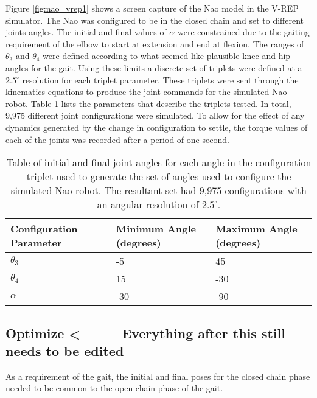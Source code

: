 Figure \ref{fig:nao_vrep1} shows a screen capture of the Nao model in the V-REP simulator. 
The Nao was configured to be in the closed chain and set to different joints angles. 
The initial and final values of $\alpha$ were constrained due to the gaiting requirement of the elbow to start at 
extension and end at flexion. The ranges of $\theta_3$ and $\theta_4$ were defined according to what seemed
like plausible knee and hip angles for the gait. Using these limits a discrete set of triplets were defined
at a $2.5^\circ$ resolution for each triplet parameter. These triplets were sent through the kinematics equations to produce the joint
commands for the simulated Nao robot. 
Table \ref{tab:angle_set_params1} lists the parameters that describe the triplets tested. In total, 9,975
different joint configurations were simulated.
To allow for the effect of
any dynamics generated by the change in configuration to settle, the torque values of each of the joints was recorded
after a period of one second.

\begin{table}
	\centering
	\begin{tabularx}{0.65\textwidth}{|X||X|X|}
		\hline
		\textbf{Configuration Parameter} 	&	\textbf{Minimum Angle (degrees)} 		&	\textbf{Maximum Angle (degrees)} 	\\	\hline\hline
		$\theta_3$ 							& 	-5										&	45	 								\\	\hline
		$\theta_4$							&	15										&	-30									\\ 	\hline
		$\alpha$							&	-30										&	-90									\\ 	\hline
	\end{tabularx} 
	
	\caption{Table of initial and final joint angles for each angle in the configuration triplet used to generate the set of
				angles used to configure the simulated Nao robot.
				The resultant set had 9,975 configurations with an angular resolution of $2.5^\circ$.}
	\label{tab:angle_set_params1}
\end{table}

\subsection{Optimize <-------- Everything after this still needs to be edited}

As a requirement of the gait, the initial and final poses for the closed chain phase needed to be common to the
open chain phase of the gait. 

